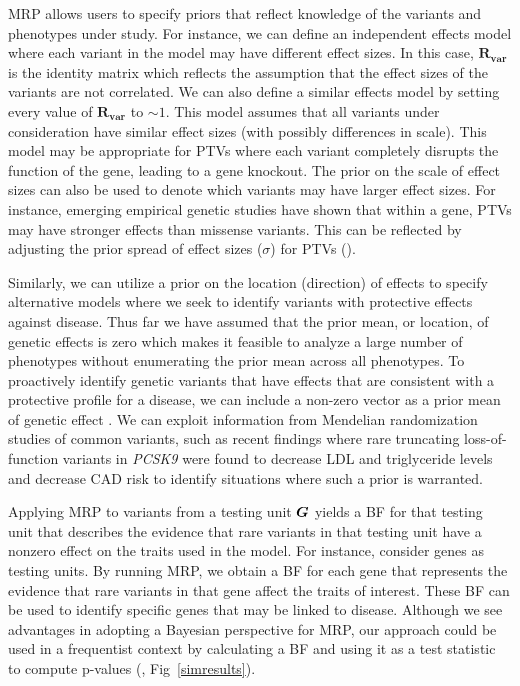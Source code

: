 MRP allows users to specify priors that reflect knowledge of the variants and phenotypes under study. For instance, we can define an independent effects model where each variant in the model may have different effect sizes. In this case, $\mathbf{R_{\textrm{var}}}$ is the identity matrix which reflects the assumption that the effect sizes of the variants are not correlated. We can also define a similar effects model by setting every value of $\mathbf{R_{\textrm{var}}}$ to $\sim 1$. This model assumes that all variants under consideration have similar effect sizes (with possibly differences in scale). This model may be appropriate for PTVs where each variant completely disrupts the function of the gene, leading to a gene knockout. The prior on the scale of effect sizes can also be used to denote which variants may have larger effect sizes. For instance, emerging empirical genetic studies have shown that within a gene, PTVs may have stronger effects than missense variants\cite{do2015exome}. This can be reflected by adjusting the prior spread of effect sizes ($\sigma$) for PTVs ().

Similarly, we can utilize a prior on the location (direction) of effects to specify alternative models where we seek to identify variants with protective effects against disease. Thus far we have assumed that the prior mean, or location, of genetic effects is zero which makes it feasible to analyze a large number of phenotypes without enumerating the prior mean across all phenotypes. To proactively identify genetic variants that have effects that are consistent with a protective profile for a disease, we can include a non-zero vector as a prior mean of genetic effect . We can exploit information from Mendelian randomization studies of common variants, such as recent findings where rare truncating loss-of-function variants in {\it PCSK9} were found to decrease LDL and triglyceride levels and decrease CAD risk\cite{cohen2005low,pcsk9,do2013common,cohorts2014loss} to identify situations where such a prior is warranted.

Applying MRP to variants from a testing unit ${\boldsymbol G}$ yields a BF for that testing unit that describes the evidence that rare variants in that testing unit have a nonzero effect on the traits used in the model. For instance, consider genes as testing units. By running MRP, we obtain a BF for each gene that represents the evidence that rare variants in that gene affect the traits of interest. These BF can be used to identify specific genes that may be linked to disease. Although we see advantages in adopting a Bayesian perspective for MRP, our approach could be used in a frequentist context by calculating a BF and using it as a test statistic to compute p-values (, Fig~\ref{simresults}).
 
